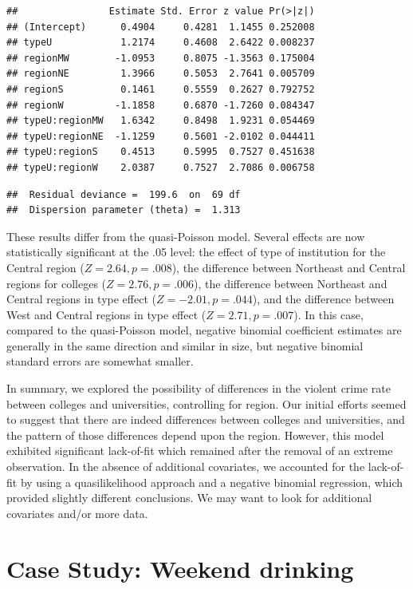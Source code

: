 \documentclass[
]{krantz}
\begin{document}
\begin{verbatim}
##                Estimate Std. Error z value Pr(>|z|)
## (Intercept)      0.4904     0.4281  1.1455 0.252008
## typeU            1.2174     0.4608  2.6422 0.008237
## regionMW        -1.0953     0.8075 -1.3563 0.175004
## regionNE         1.3966     0.5053  2.7641 0.005709
## regionS          0.1461     0.5559  0.2627 0.792752
## regionW         -1.1858     0.6870 -1.7260 0.084347
## typeU:regionMW   1.6342     0.8498  1.9231 0.054469
## typeU:regionNE  -1.1259     0.5601 -2.0102 0.044411
## typeU:regionS    0.4513     0.5995  0.7527 0.451638
## typeU:regionW    2.0387     0.7527  2.7086 0.006758
\end{verbatim}

\begin{verbatim}
##  Residual deviance =  199.6  on  69 df 
##  Dispersion parameter (theta) =  1.313
\end{verbatim}

These results differ from the quasi-Poisson model. Several effects are now statistically significant at the .05 level: the effect of type of institution for the Central region (\(Z=2.64, p=.008\)), the difference between Northeast and Central regions for colleges (\(Z=2.76, p=.006\)), the difference between Northeast and Central regions in type effect (\(Z=-2.01, p=.044\)), and the difference between West and Central regions in type effect (\(Z=2.71, p=.007\)). In this case, compared to the quasi-Poisson model, negative binomial coefficient estimates are generally in the same direction and similar in size, but negative binomial standard errors are somewhat smaller.

In summary, we explored the possibility of differences in the violent crime rate between colleges and universities, controlling for region. Our initial efforts seemed to suggest that there are indeed differences between colleges and universities, and the pattern of those differences depend upon the region. However, this model exhibited significant lack-of-fit which remained after the removal of an extreme observation. In the absence of additional covariates, we accounted for the lack-of-fit by using a quasilikelihood approach and a negative binomial regression, which provided slightly different conclusions. We may want to look for additional covariates and/or more data.

\hypertarget{cs:drinking}{%
\section{Case Study: Weekend drinking}\label{cs:drinking}}
\end{document}
